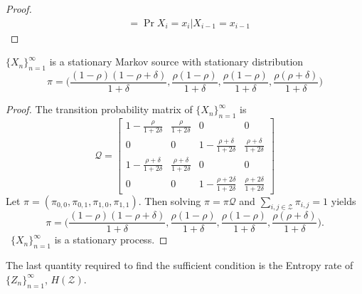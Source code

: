 \documentclass[
  coursecode={MTHE 474},
  assignmentname={Homework \homeworknumber},
  studentnumber=20053722,
  name={Bryan Hoang},
  draft,
]{
  ltxanswer%
}
\begin{document}
\begin{questions}
\begin{parts}
\begin{solution}
\begin{proof}
\begin{align*}
             &= \Pr{X_{i}=x_{i}|X_{i-1}=x_{i-1}}
          \end{align*}
        \end{proof}
        \begin{claim}
          \(\{X_{n}\}_{n=1}^{\infty}\) is a stationary Markov source with stationary distribution
          \begin{equation*}
            \pi = \biggl(\frac{(1-\rho)(1-\rho+\delta)}{1+\delta}, \frac{\rho(1-\rho)}{1+\delta}, \frac{\rho(1-\rho)}{1+\delta}, \frac{\rho(\rho+\delta)}{1+\delta}\biggr)
          \end{equation*}
        \end{claim}
        \begin{proof}
          The transition probability matrix of \(\{X_{n}\}_{n=1}^{\infty}\) is
          \begin{equation*}
            \mathcal{Q} = \begin{bmatrix}
              1 - \frac{\rho}{1+2\delta}        & \frac{\rho}{1+2\delta}        & 0                                  & 0                              \\
              0                                 & 0                             & 1 - \frac{\rho+\delta}{1+2\delta}  & \frac{\rho+\delta}{1+2\delta}  \\
              1 - \frac{\rho+\delta}{1+2\delta} & \frac{\rho+\delta}{1+2\delta} & 0                                  & 0                              \\
              0                                 & 0                             & 1 - \frac{\rho+2\delta}{1+2\delta} & \frac{\rho+2\delta}{1+2\delta}
            \end{bmatrix}
          \end{equation*}
          Let \(\pi=(\pi_{0,0},\pi_{0,1},\pi_{1,0},\pi_{1,1})\). Then solving \(\pi=\pi\mathcal{Q}\) and \(\sum_{i,j\in\mathcal{Z}} \pi_{i,j} = 1\) yields
          \begin{equation*}
            \pi = \biggl(\frac{(1-\rho)(1-\rho+\delta)}{1+\delta}, \frac{\rho(1-\rho)}{1+\delta}, \frac{\rho(1-\rho)}{1+\delta}, \frac{\rho(\rho+\delta)}{1+\delta}\biggr).
          \end{equation*}
          \therefore\ \(\{X_{n}\}_{n=1}^{\infty}\) is a stationary process.
        \end{proof}
        The last quantity required to find the sufficient condition is the Entropy rate of \(\{Z_{n}\}_{n=1}^{\infty}\), \(H(\mathcal{Z})\).
        \begin{align*}

\end{align*}
\end{solution}
\end{parts}
\end{questions}
\end{document}
